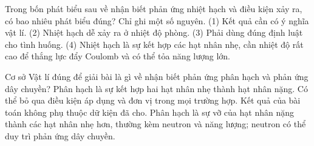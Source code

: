 \begin{ex}
Trong bốn phát biểu sau về nhận biết phản ứng nhiệt hạch và điều kiện xảy ra, có bao nhiêu phát biểu đúng? Chỉ ghi một số nguyên. (1) Kết quả cần có ý nghĩa vật lí. (2) Nhiệt hạch dễ xảy ra ở nhiệt độ phòng. (3) Phải dùng đúng định luật cho tình huống. (4) Nhiệt hạch là sự kết hợp các hạt nhân nhẹ, cần nhiệt độ rất cao để thắng lực đẩy Coulomb và có thể tỏa năng lượng lớn.
\end{ex}

\begin{ex}
Cơ sở Vật lí đúng để giải bài là gì về nhận biết phản ứng phân hạch và phản ứng dây chuyền?
\choice
{Phân hạch là sự kết hợp hai hạt nhân nhẹ thành hạt nhân nặng.}
{Có thể bỏ qua điều kiện áp dụng và đơn vị trong mọi trường hợp.}
{Kết quả của bài toán không phụ thuộc dữ kiện đã cho.}
{\True Phân hạch là sự vỡ của hạt nhân nặng thành các hạt nhân nhẹ hơn, thường kèm neutron và năng lượng; neutron có thể duy trì phản ứng dây chuyền.}
\end{ex}

